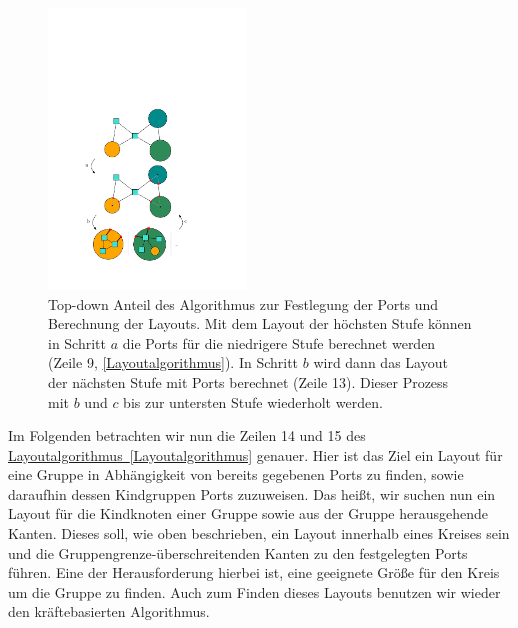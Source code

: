 \begin{figure}[h!]
\begin{center} 
  \includegraphics[width=0.47\textwidth]{Pics/TopDown.pdf}
  \caption{Top-down Anteil des Algorithmus zur Festlegung der Ports und Berechnung der Layouts.
  Mit dem Layout der höchsten Stufe können in Schritt $a$ die Ports für die niedrigere Stufe berechnet werden (Zeile 9, \autoref{Layoutalgorithmus}).
  In Schritt $b$ wird dann das Layout der nächsten Stufe mit Ports berechnet (Zeile 13).
  Dieser Prozess mit $b$ und $c$ bis zur untersten Stufe wiederholt werden. }
  \label{f:TopDown}
\end{center}
\end{figure}


Im Folgenden betrachten wir nun die Zeilen 14 und 15 des \hyperref[Layoutalgorithmus]{Layoutalgorithmus~\ref*{Layoutalgorithmus}} genauer. 
Hier ist das Ziel ein Layout für eine Gruppe in Abhängigkeit von bereits gegebenen Ports zu finden, sowie daraufhin dessen Kindgruppen Ports zuzuweisen.
Das heißt, wir suchen nun ein Layout für die Kindknoten einer Gruppe sowie aus der Gruppe herausgehende Kanten.
Dieses soll, wie oben beschrieben, ein Layout innerhalb eines Kreises sein und die Gruppengrenze-überschreitenden Kanten zu den festgelegten Ports führen.
Eine der Herausforderung hierbei ist, eine geeignete Größe für den Kreis um die Gruppe zu finden. 
Auch zum Finden dieses Layouts benutzen wir wieder den kräftebasierten Algorithmus.

